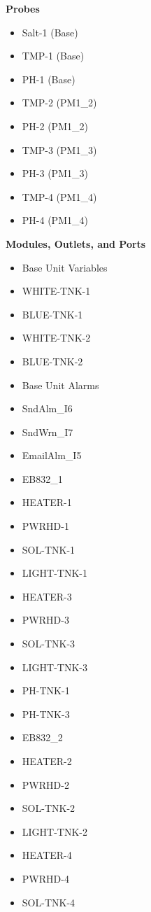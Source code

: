 \documentclass[]{book}
\providecommand{\tightlist}{%
  \setlength{\itemsep}{0pt}\setlength{\parskip}{0pt}}
\begin{document}
 \textbf{Probes}

\begin{itemize}
\tightlist
\item
  Salt-1 (Base)
\item
  TMP-1 (Base)
\item
  PH-1 (Base)
\item
  TMP-2 (PM1\_2)
\item
  PH-2 (PM1\_2)
\item
  TMP-3 (PM1\_3)
\item
  PH-3 (PM1\_3)
\item
  TMP-4 (PM1\_4)
\item
  PH-4 (PM1\_4)
\end{itemize}

 \textbf{Modules, Outlets, and Ports}

\begin{itemize}
\tightlist
\item
  Base Unit Variables
\item
  WHITE-TNK-1
\item
  BLUE-TNK-1
\item
  WHITE-TNK-2
\item
  BLUE-TNK-2
\item
  Base Unit Alarms\\
\item
  SndAlm\_I6
\item
  SndWrn\_I7
\item
  EmailAlm\_I5
\item
  EB832\_1
\item
  HEATER-1
\item
  PWRHD-1
\item
  SOL-TNK-1
\item
  LIGHT-TNK-1
\item
  HEATER-3
\item
  PWRHD-3
\item
  SOL-TNK-3
\item
  LIGHT-TNK-3
\item
  PH-TNK-1
\item
  PH-TNK-3
\item
  EB832\_2
\item
  HEATER-2
\item
  PWRHD-2
\item
  SOL-TNK-2
\item
  LIGHT-TNK-2
\item
  HEATER-4
\item
  PWRHD-4
\item
  SOL-TNK-4

\end{itemize}
\end{document}
